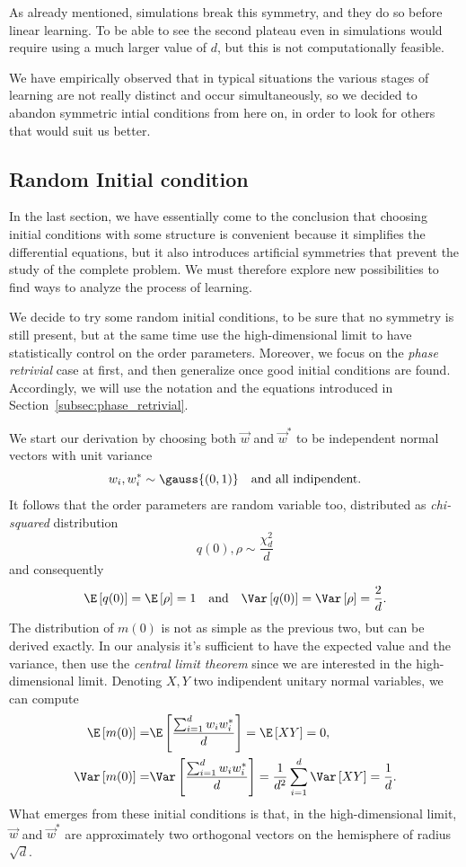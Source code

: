 As already mentioned, simulations break this symmetry, and they do so before linear learning.
To be able to see the second plateau even in simulations would require using a much larger value of \(d\),
but this is not computationally feasible. 

We have empirically observed that in typical situations the various stages of learning are not really distinct and occur simultaneously,
so we decided to abandon symmetric intial conditions from here on,
in order to look for others that would suit us better.


\subsection{Random Initial condition} \label{subsec:random-initial-conditions}
In the last section, we have essentially come to the conclusion that
choosing initial conditions with some structure is convenient
because it simplifies the differential equations,
but it also introduces artificial symmetries that prevent the study of the complete problem.
We must therefore explore new possibilities to find ways to analyze the process of learning.

We decide to try some random initial conditions, to be sure that no symmetry is still present,
but at the same time use the high-dimensional limit to have statistically control on the 
order parameters. Moreover, we focus on the \emph{phase retrivial} case at first, 
and then generalize once good initial conditions are found.
Accordingly, we will use the notation and the equations introduced in Section~\ref{subsec:phase_retrivial}.

We start our derivation by choosing both \(\vec{w}\) and \(\vec{w}^*\) to be independent normal
vectors with unit variance
\[
  w_{i}, w^*_{i} \sim \gauss{(0,1)}\quad\text{and all indipendent.}
\]
It follows that the order parameters are random variable too, distributed as
\emph{chi-squared} distribution
\[
  q(0),\rho \sim \frac{\chi^2_d}{d}
\]
and consequently 
\[
  \E\left[q(0)\right] = \E\left[\rho\right] = 1 \quad\text{and}\quad
  \Var\left[q(0)\right] = \Var\left[\rho\right] = \frac{2}{d}.
\]
The distribution of \(m{(0)}\) is not as simple as the previous two, but can be derived exactly.
In our analysis it's sufficient to have the expected value and the variance, then use the 
\emph{central limit theorem} since we are interested in the high-dimensional limit.
Denoting \(X,Y\) two indipendent unitary normal variables, we can compute
\[\begin{split}
  \E\left[m{(0)}\right] =& \E\left[\frac{\sum_{i=1}^d w_iw^*_i}{d}\right] = \E\left[XY\right] = 0, \\
  \Var\left[m{(0)}\right] =& \Var\left[\frac{\sum_{i=1}^d w_iw^*_i}{d}\right]
    = \frac{1}{d^2}\sum_{i=1}^d \Var\left[XY\right] = \frac{1}{d}.
\end{split}\]
What emerges from these initial conditions is that, in the high-dimensional limit,
\(\vec{w}\) and \(\vec{w}^*\) are approximately two orthogonal vectors on the hemisphere of radius \(\sqrt{d}\).

